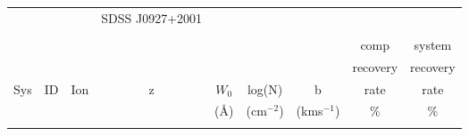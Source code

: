 \documentclass[12pt]{article}
\begin{document}
\begin{footnotesize}
\begin{longtable}{ c c c c c c c c c}  
			&	   &                           &            \Large{SDSS J0927+2001}    & 	& 					&							  	\\     
	     &        	&                           &				&				   &	                    &         	     		 	&  \\              
\hline                                                                                                                                                   
\hline                                                                                                                                                   
     	        &     	&                           &				&				   &	                    &         	     		 	& 		comp		& 		system	  	 \\    
                                                                                                                                                         
        &     	&                           &				&				   &	                    &         	     		 	& 		recovery			& 		recovery  	 \\    
   Sys  & ID  &   Ion     				   &  z 			&      $W_0$       &     log(N)				&    b						&   	rate	&   	rate   \\                      
          &         &                           &			&     	(\AA)		 &    (cm$^{-2}$)     &    (kms$^{ -1}$)	&        	$\%$	       & $\%$	\\         
		&	   &                           &            & 	& 					&							  	& \\                                                                 
                                                                                                                                                         

\end{longtable}
\end{footnotesize}
\end{document}
